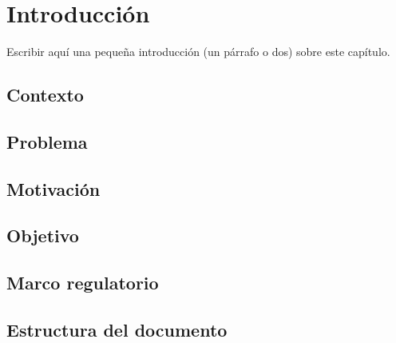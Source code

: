 \chapter{Introducción}
\label{chap:01intro}

Escribir aquí una pequeña introducción (un párrafo o dos) sobre este capítulo.

\section{Contexto}

\section{Problema}

\section{Motivación}

\section{Objetivo}

\section{Marco regulatorio}

\section{Estructura del documento}
